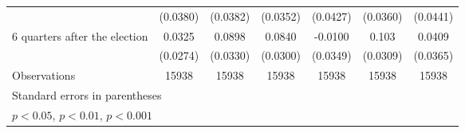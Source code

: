 \begin{table}[htbp]
\begin{tabular}{l*{6}{c}}
                    &    (0.0380)         &    (0.0382)         &    (0.0352)         &    (0.0427)         &    (0.0360)         &    (0.0441)         \\
[1em]
 6 quarters after the election&      0.0325         &      0.0898\sym{**} &      0.0840\sym{**} &     -0.0100         &       0.103\sym{***}&      0.0409         \\
                    &    (0.0274)         &    (0.0330)         &    (0.0300)         &    (0.0349)         &    (0.0309)         &    (0.0365)         \\
\hline
Observations        &       15938         &       15938         &       15938         &       15938         &       15938         &       15938         \\
\hline\hline
\multicolumn{7}{l}{\footnotesize Standard errors in parentheses}\\
\multicolumn{7}{l}{\footnotesize \sym{*} \(p<0.05\), \sym{**} \(p<0.01\), \sym{***} \(p<0.001\)}\\
\end{tabular}
\end{table}
